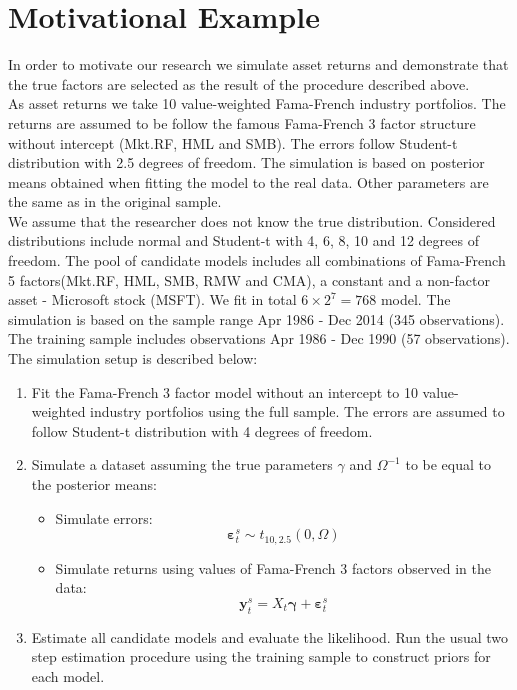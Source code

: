 \documentclass[12pt]{article}
\begin{document}
\section{Motivational Example}
In order to motivate our research we simulate asset returns and demonstrate that the true factors are selected as the result of the procedure described above. \\
As asset returns we take 10 value-weighted Fama-French industry portfolios. The returns are assumed to be follow the famous Fama-French 3 factor structure without intercept (Mkt.RF, HML and SMB). The errors follow Student-t distribution with 2.5 degrees of freedom. The simulation is based on posterior means obtained when fitting the model to the real data. Other parameters are the same as in the original sample. \\
We assume that the researcher does not know the true distribution. Considered distributions include normal and Student-t with 4, 6, 8, 10 and 12 degrees of freedom. The pool of candidate models includes all combinations of Fama-French 5 factors(Mkt.RF, HML, SMB, RMW and CMA), a constant and a non-factor asset - Microsoft stock (MSFT). We fit in total $6\times 2^{7} = 768$ model. The simulation is based on the sample range Apr 1986 - Dec 2014 (345 observations). The training sample includes observations Apr 1986 - Dec 1990 (57 observations). \\
The simulation setup is described below:
\begin{enumerate}
	\item Fit the Fama-French 3 factor model without an intercept to 10 value-weighted industry portfolios using the full sample. The errors are assumed to follow Student-t distribution with 4 degrees of freedom. 
	\item Simulate a dataset assuming the true parameters  $\gamma$ and $\Omega^{-1} $ to be equal to the posterior means:
	\begin{itemize}
		\item Simulate errors:
		\begin{equation*}
		\boldsymbol{\varepsilon}^s_{t}\sim t_{10,2.5 }\left( 0,\Omega \right)
		\end{equation*}
		\item Simulate returns using values of Fama-French 3 factors observed in the data:
		\begin{equation*}
		\mathbf{y}_t^s = X_t \boldsymbol{\gamma} + \boldsymbol{\varepsilon}^s_t
		\end{equation*}
	\end{itemize}
	\item Estimate all candidate models and evaluate the likelihood. Run the usual two step estimation procedure using the training sample to construct priors for each model.  
\end{enumerate}
\end{document}
